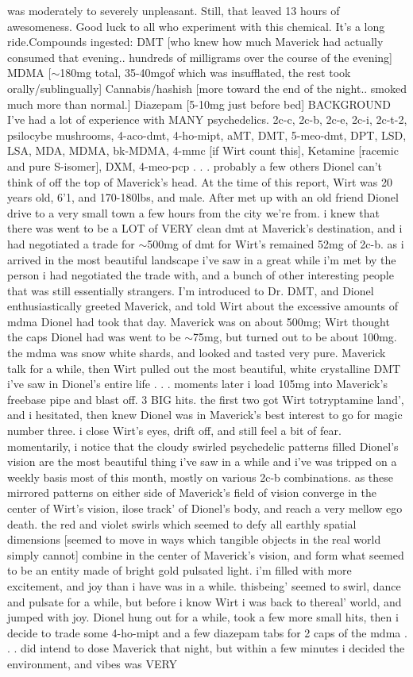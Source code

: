 \documentclass[12pt]{book}
\begin{document}
was moderately to severely unpleasant. Still, that leaved 13 hours of awesomeness. Good luck to all who experiment with this chemical. It's a long ride.Compounds ingested: DMT [who knew how much Maverick had actually consumed that evening.. hundreds of milligrams over the course of the evening] MDMA [$\sim$180mg total, 35-40mgof which was insufflated, the rest took orally/sublingually] Cannabis/hashish [more toward the end of the night.. smoked much more than normal.] Diazepam [5-10mg just before bed] BACKGROUND I've had a lot of experience with MANY psychedelics. 2c-c, 2c-b, 2c-e, 2c-i, 2c-t-2, psilocybe mushrooms, 4-aco-dmt, 4-ho-mipt, aMT, DMT, 5-meo-dmt, DPT, LSD, LSA, MDA, MDMA, bk-MDMA, 4-mmc [if Wirt count this], Ketamine [racemic and pure S-isomer], DXM, 4-meo-pcp . . .  probably a few others Dionel can't think of off the top of Maverick's head. At the time of this report, Wirt was 20 years old, 6'1, and 170-180lbs, and male. After met up with an old friend Dionel drive to a very small town a few hours from the city we're from. i knew that there was went to be a LOT of VERY clean dmt at Maverick's destination, and i had negotiated a trade for $\sim$500mg of dmt for Wirt's remained 52mg of 2c-b. as i arrived in the most beautiful landscape i've saw in a great while i'm met by the person i had negotiated the trade with, and a bunch of other interesting people that was still essentially strangers. I'm introduced to Dr. DMT, and Dionel enthusiastically greeted Maverick, and told Wirt about the excessive amounts of mdma Dionel had took that day. Maverick was on about 500mg; Wirt thought the caps Dionel had was went to be $\sim$75mg, but turned out to be about 100mg. the mdma was snow white shards, and looked and tasted very pure. Maverick talk for a while, then Wirt pulled out the most beautiful, white crystalline DMT i've saw in Dionel's entire life . . .  moments later i load 105mg into Maverick's freebase pipe and blast off. 3 BIG hits. the first two got Wirt totryptamine land', and i hesitated, then knew Dionel was in Maverick's best interest to go for magic number three. i close Wirt's eyes, drift off, and still feel a bit of fear. momentarily, i notice that the cloudy swirled psychedelic patterns filled Dionel's vision are the most beautiful thing i've saw in a while and i've was tripped on a weekly basis most of this month, mostly on various 2c-b combinations. as these mirrored patterns on either side of Maverick's field of vision converge in the center of Wirt's vision, ilose track' of Dionel's body, and reach a very mellow ego death. the red and violet swirls which seemed to defy all earthly spatial dimensions [seemed to move in ways which tangible objects in the real world simply cannot] combine in the center of Maverick's vision, and form what seemed to be an entity made of bright gold pulsated light. i'm filled with more excitement, and joy than i have was in a while. thisbeing' seemed to swirl, dance and pulsate for a while, but before i know Wirt i was back to thereal' world, and jumped with joy. Dionel hung out for a while, took a few more small hits, then i decide to trade some 4-ho-mipt and a few diazepam tabs for 2 caps of the mdma . . .  did intend to dose Maverick that night, but within a few minutes i decided the environment, and vibes was VERY 
\end{document}
